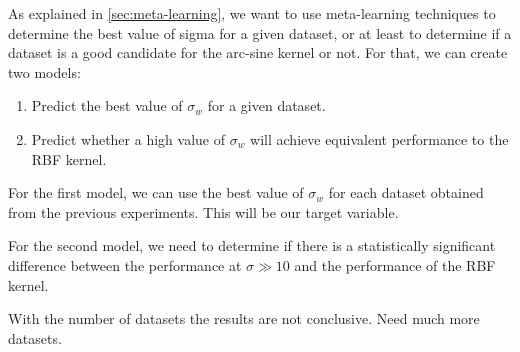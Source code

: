 As explained in \cref{sec:meta-learning}, we want to use meta-learning
techniques to determine the best value of sigma for a given dataset, or at least
to determine if a dataset is a good candidate for the arc-sine kernel or not.
For that, we can create two models:
\begin{enumerate}
    \item Predict the best value of $\sigma_w$ for a given dataset.
    \item Predict whether a high value of $\sigma_w$ will achieve equivalent
          performance to the RBF kernel.
\end{enumerate}

For the first model,
we can use the best value of $\sigma_w$ for each dataset
obtained from the previous experiments. This will be our target
variable.

For the second model, we need to determine if there is a statistically
significant difference between the performance at $\sigma \gg 10$ and the
performance of the RBF kernel.


\begin{note}
    With the number of datasets the results are not conclusive.
    Need much more datasets.
\end{note}
